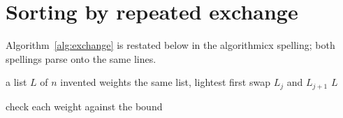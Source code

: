 \documentclass{article}
\begin{document}
\section{Sorting by repeated exchange}

\begin{algorithm}
\caption{Exchange sort of an invented list.}
\label{alg:exchange}
\LinesNumbered
{}
\;
\end{algorithm}

Algorithm~\ref{alg:exchange} is restated below in the algorithmicx
spelling; both spellings parse onto the same lines.

\begin{algorithm}
\caption{The same exchange sort, algorithmicx spelling.}
\begin{algorithmic}[1]
\Require a list $L$ of $n$ invented weights
\Ensure the same list, lightest first
      \State swap $L_j$ and $L_{j+1}$ 
    \EndIf
  \EndFor
\EndFor
\State \Return $L$
\end{algorithmic}
\end{algorithm}

\begin{algorithm}
check each weight against the bound\;
\end{algorithm}
\end{document}
